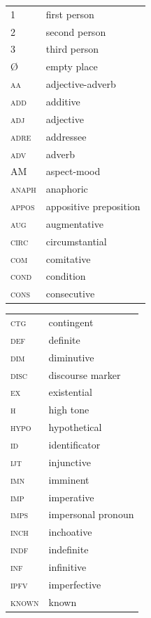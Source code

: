 \documentclass[output=paper,colorlinks=true, citecolor=brown]{langscibook}
\begin{document}
\begin{tabularx}{.45\textwidth}{lQ}
\scshape 1 & first person\\ 
\scshape 2 & second person\\ 
\scshape 3 & third person\\ 
\scshape Ø & empty place\\ 
\scshape aa & adjective-adverb\\ 
\scshape add & additive\\ 
\scshape adj & adjective\\ 
\scshape adre & addressee\\ 
\scshape adv & adverb\\ 
AM & aspect-mood\\ 
\scshape anaph & anaphoric\\ 
\scshape appos & appositive preposition\\ 
\scshape aug & augmentative\\ 
\scshape circ & circumstantial\\ 
\scshape com & comitative\\ 
\scshape cond & condition\\
\scshape cons & consecutive\\
\end{tabularx}
\begin{tabularx}{.45\textwidth}{lQ}
\scshape ctg & contingent\\ 
\scshape def & definite\\ 
\scshape dim & diminutive\\ 
\scshape disc & discourse marker\\ 
\scshape ex & existential\\ 
\scshape h & high tone\\ 
\scshape hypo & hypothetical\\ 
\scshape id & identificator \\ 
\scshape ijt & injunctive\\ 
\scshape imn & imminent\\ 
\scshape imp & imperative\\ 
\scshape imps & impersonal pronoun\\ 
\scshape inch & inchoative\\ 
\scshape indf & indefinite\\ 
\scshape inf & infinitive\\ 
\scshape ipfv & imperfective\\ 
\scshape known & known\\ 
\end{tabularx}
\end{document}
